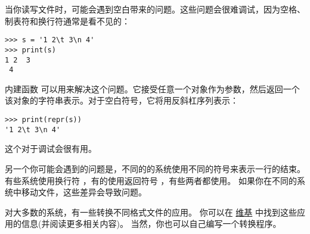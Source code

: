 {{{{{{{%

当你读写文件时，可能会遇到空白带来的问题。这些问题会很难调试，因为空格、制表符和换行符通常是看不见的：

\begin{lstlisting}
>>> s = '1 2\t 3\n 4'
>>> print(s)
1 2  3
 4
\end{lstlisting}
  


内建函数  可以用来解决这个问题。它接受任意一个对象作为参数，然后返回一个该对象的字符串表示。对于空白符号，它将用反斜杠序列表示：

\begin{lstlisting}
>>> print(repr(s))
'1 2\t 3\n 4'
\end{lstlisting}


这个对于调试会很有用。


另一个你可能会遇到的问题是，不同的的系统使用不同的符号来表示一行的结束。
有些系统使用换行符 ，有的使用返回符号 \li{\r} ，有些两者都使用。
如果你在不同的系统中移动文件，这些差异会导致问题。


对大多数的系统，有一些转换不同格式文件的应用。
你可以在 \href{http://en.wikipedia.org/wiki/Newline}{维基} 中找到这些应用的信息(并阅读更多相关内容)。 当然，你也可以自己编写一个转换程序。


}}}}}}}
